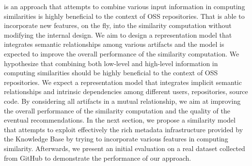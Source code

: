 \CrossSim is an approach that attempts to combine various input information in computing similarities is highly beneficial to the context of OSS repositories. That is able to incorporate new features, on the fly, into the similarity computation without modifying the internal design. We aim to design a representation model that integrates semantic relationships among various artifacts and the model is expected to improve the overall performance of the similarity computation. We hypothesize that combining both low-level and high-level information in computing similarities should be highly beneficial to the context of OSS repositories. We expect a representation model that integrates implicit semantic relationships and intrinsic dependencies among different users, repositories, source code. By considering all artifacts in a mutual relationship, we aim at improving the overall performance of the similarity computation and the quality of the eventual recommendations. In the next section, we propose a similarity model that attempts to exploit effectively the rich metadata infrastructure provided by the \projectName Knowledge Base by trying to incorporate various features in computing similarity. Afterwards, we present an initial evaluation on a real dataset collected from GitHub to demonstrate the performance of our approach. 






























